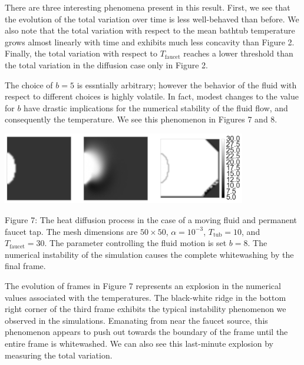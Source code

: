\documentclass[12pt]{amsart}
\begin{document}
There are three interesting phenomena present in this result. First, we see that
the evolution of the total variation over time is less well-behaved than before.
We also note that the total variation with respect to the mean bathtub
temperature grows almost linearly with time and exhibits much less concavity
than Figure 2. Finally, the total variation with respect to
$T_{\mathrm{faucet}}$ reaches a lower threshold than the total variation in the
diffusion case only in Figure 2.

The choice of $b=5$ is essntially arbitrary; however the behavior of the fluid
with respect to different choices is highly volatile. In fact, modest changes to
the value for $b$ have drastic implications for the numerical stability of the
fluid flow, and consequently the temperature. We see this phenomenon in Figures
7 and 8. 

\begin{center}
    \includegraphics[width=0.8\textwidth]{../plots/diffusion-04.png}

    \justify
    \footnotesize{
    Figure 7: The heat diffusion process in the case of a moving fluid and
    permanent faucet tap. The mesh dimensions are $50 \times 50$, $\alpha =
    10^{-3}$, $T_{\mathrm{tub}} = 10$, and $T_{\mathrm{faucet}} = 30$. The
    parameter controlling the fluid motion is set $b = 8$. The numerical
    instability of the simulation causes the complete whitewashing by the final
frame.}
\end{center}

The evolution of frames in Figure 7 represents an explosion in the numerical
values associated with the temperatures. The black-white ridge in the bottom
right corner of the third frame exhibits the typical instability phenomenon we
observed in the simulations. Emanating from near the faucet source, this
phenomenon appears to push out towards the boundary of the frame until the
entire frame is whitewashed. We can also see this last-minute explosion by
measuring the total variation.
\end{document}
